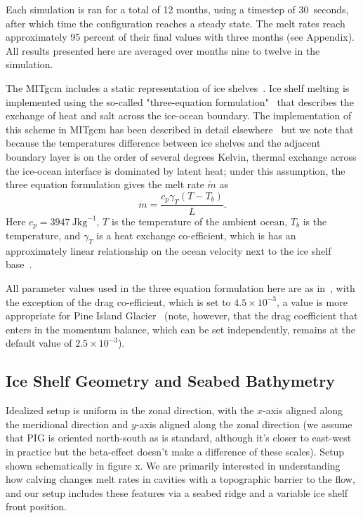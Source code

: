 \documentclass[draft]{agujournal2019}
\begin{document}
Each simulation is ran for a total of 12 months, using a timestep of 30~\si{seconds}, after which time the configuration reaches a steady state. The melt rates reach approximately 95 percent of their final values with three months (see Appendix). All results presented here are averaged over months nine to twelve in the simulation. 

The MITgcm includes a static representation of ice shelves~\cite{Losch2008JGeophysResOceans}. Ice shelf melting is implemented using the so-called "three-equation formulation"~\cite{Holland1999JPhysOcean} that describes the exchange of heat and salt across the ice-ocean boundary. The implementation of this scheme in MITgcm has been described in detail elsewhere~\cite[for example]{DeRydt2014JGeophysResOceans,Dansereau2014JGROceans} but we note that because the temperatures difference between ice shelves and the adjacent boundary layer is on the order of several degrees Kelvin, thermal exchange across the ice-ocean interface is dominated by latent heat; under this assumption, the three equation formulation gives the melt rate $\dot{m}$ as
\begin{equation}
    \dot{m} = \frac{c_p \gamma_T (T - T_b)}{L}.
\end{equation}
Here $c_p = 3947~\si{\joule \kilogram}^{-1}$, $T$ is the temperature of the ambient ocean, $T_b$ is the temperature, and $\gamma_T$ is a heat exchange co-efficient, which is has an approximately linear relationship on the ocean velocity next to the ice shelf base~\cite{Holland1999JPhysOcean}.

All parameter values used in the three equation formulation here are as in~, with the exception of the drag co-efficient, which is set to $4.5\times10^{-3}$, a value is more appropriate for Pine Island Glacier~\cite{Dutrieux2014Science} (note, however, that the drag coefficient that enters in the momentum balance, which can be set independently, remains at the default value of $2.5\times 10^{-3}$).

\subsection{Ice Shelf Geometry and Seabed Bathymetry}\label{S:Experiment:Geometry}
Idealized setup is uniform in the zonal direction, with the $x$-axis aligned along the meridional direction and $y$-axis aligned along the zonal direction (we assume that PIG is oriented north-south as is standard, although it's closer to east-west in practice but the beta-effect doesn't make a difference of these scales). Setup shown schematically in figure x. We are primarily interested in understanding how calving changes melt rates in cavities with a topographic barrier to the flow, and our setup includes these features via a seabed ridge and a variable ice shelf front position. 
\end{document}
